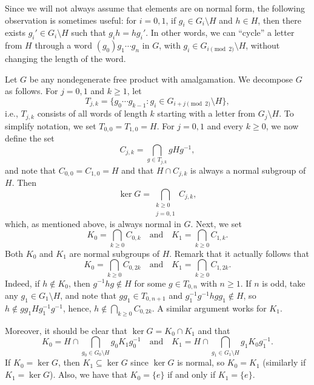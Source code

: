 \documentclass[a4paper]{amsart}
\theoremstyle{plain}
\theoremstyle{definition}
\theoremstyle{remark}
\numberwithin{theorem}{section}
\begin{document}
Since we will not always assume that elements are on normal form,
the following observation is sometimes useful:
for $i=0,1$, if $g_i\in G_i\setminus H$ and $h\in H$,
then there exists $g_i'\in G_i\setminus H$ such that $g_ih=hg_i'$.
In other words, we can ``cycle'' a letter from $H$ through a word $(g_0)g_1\dotsm g_n$ in $G$,
with $g_i\in G_{i\pmod 2}\setminus H$, without changing the length of the word.

Let $G$ be any nondegenerate free product with amalgamation.
We decompose $G$ as follows.
For $j=0,1$ and $k\geq 1$, let
\[
T_{j,k}=\{g_0\dotsm g_{k-1} : g_i\in G_{i+j\pmod 2}\setminus H\},
\]
i.e., $T_{j,k}$ consists of all words of length $k$ starting with a letter from $G_j\setminus H$.
To simplify notation, we set $T_{0,0}=T_{1,0}=H$.
For $j=0,1$ and every $k\geq 0$, we now define the set
\begin{equation}\label{eq:C-jk}
C_{j,k}=\bigcap_{g\in T_{j,k}}gHg^{-1},
\end{equation}
and note that $C_{0,0}=C_{1,0}=H$ and that $H\cap C_{j,k}$ is always a normal subgroup of $H$.
Then
\[
\ker G=\bigcap_{\substack{k\geq 0 \\ j=0,1}} C_{j,k},
\]
which, as mentioned above, is always normal in $G$.
Next, we set
\begin{equation}\label{eq:K0K1}
K_0=\bigcap_{k\geq 0}C_{0,k}
\quad\text{and}\quad
K_1=\bigcap_{k\geq 0}C_{1,k}.
\end{equation}
Both $K_0$ and $K_1$ are normal subgroups of $H$.
Remark that it actually follows that
\begin{equation}\label{eq:even-length}
K_0=\bigcap_{k\geq 0}C_{0,2k}
\quad\text{and}\quad
K_1=\bigcap_{k\geq 0}C_{1,2k}.
\end{equation}
Indeed, if $h\notin K_0$, then $g^{-1}hg\notin H$ for some $g\in T_{0,n}$ with $n\geq 1$.
If $n$ is odd, take any $g_1\in G_1\setminus H$, and note that $gg_1\in T_{0,n+1}$ and $g_1^{-1}g^{-1}hgg_1\notin H$,
so $h\notin gg_1Hg_1^{-1}g^{-1}$, hence, $h\notin \bigcap_{k\geq 0}C_{0,2k}$.
A similar argument works for $K_1$.

Moreover, it should be clear that $\ker G=K_0\cap K_1$ and that
\begin{equation}\label{eq:K0-K1-relation}
K_0=H\cap\bigcap_{g_0\in G_0\setminus H}g_0K_1g_0^{-1}
\quad\text{and}\quad
K_1=H\cap\bigcap_{g_1\in G_1\setminus H}g_1K_0g_1^{-1}.
\end{equation}
If $K_0=\ker G$, then $K_1\subseteq\ker G$ since $\ker G$ is normal, so $K_0=K_1$ (similarly if $K_1=\ker G$).
Also, we have that $K_0=\{e\}$ if and only if $K_1=\{e\}$.
\end{document}
